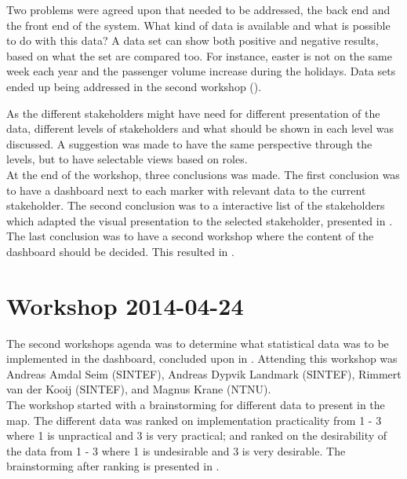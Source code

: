 Two problems were agreed upon that needed to be addressed, the back end and 
the  front end of the system. What kind of data is available and what is 
possible to do with this data? A data set can show both positive and negative 
results, based on what the set are compared too. For instance, easter is not 
on the same week each year and the passenger volume increase during the 
holidays. Data sets ended up being addressed in the second workshop (). 

As the different stakeholders might have need for different presentation of the
data, different levels of stakeholders and what should be shown in each level 
was discussed. A suggestion was made to have the same perspective through the
levels, but to have selectable views based on roles. \\

At the end of the workshop, three conclusions was made. The first conclusion 
was to have a dashboard next to each marker with relevant data to the current 
stakeholder. The second conclusion was to a interactive list of the
stakeholders which adapted the visual presentation to the selected stakeholder,
presented in .
The last conclusion was to have a second workshop where the content of the
dashboard should be decided. This resulted in .


\section{Workshop 2014-04-24} %
\label{sec:workshop_2014_04_24}
The second workshops agenda was to determine what statistical data was 
to be implemented in the dashboard, concluded upon in .
Attending this workshop was Andreas Amdal Seim (SINTEF), Andreas Dypvik 
Landmark (SINTEF), Rimmert van der Kooij (SINTEF), and Magnus Krane (NTNU).\\

The workshop started with a brainstorming for different data to present in
the map. The different data was ranked on implementation practicality from 1 - 
3 where 1 is unpractical and 3 is very practical; and ranked on the 
desirability of the data from 1 - 3 where 1 is undesirable and 3 is very 
desirable. The brainstorming after ranking is presented in .
\\

